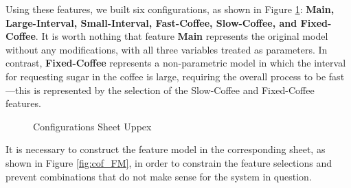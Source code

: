 Using these features, we built six configurations, as shown in Figure \ref{fig:cof_CM}: \textbf{Main, Large-Interval, Small-Interval, Fast-Coffee, Slow-Coffee, and Fixed-Coffee}. It is worth nothing that feature \textbf{Main} represents the original model without any modifications, with all three variables treated as parameters. In contrast, \textbf{Fixed-Coffee} represents a non-parametric model in which the interval for requesting sugar in the coffee is large, requiring the overall process to be fast—this is represented by the selection of the Slow-Coffee and Fixed-Coffee features.

\begin{figure}[H]
    \centering
    \begin{minipage}{0.5\textwidth}
        \centering
        \caption{Configurations Sheet Uppex}
        \label{fig:cof_CM}
    \end{minipage}
\end{figure}

It is necessary to construct the feature model in the corresponding sheet, as shown in Figure \ref{fig:cof_FM}, in order to constrain the feature selections and prevent combinations that do not make sense for the system in question.

